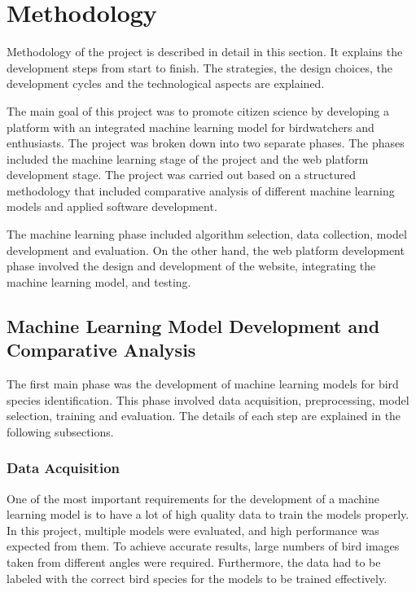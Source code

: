 \section{Methodology}

Methodology of the project is described in detail in this section. It explains the development steps from start to finish.
The strategies, the design choices, the development cycles and the technological aspects are explained.

The main goal of this project was to promote citizen science by developing a platform with an integrated machine learning model for birdwatchers and enthusiasts.
The project was broken down into two separate phases. The phases included the machine learning stage of the project and the web platform development stage. 
The project was carried out based on a structured methodology that included comparative analysis of different machine learning models and applied software development.

The machine learning phase included algorithm selection, data collection, model development and evaluation.
On the other hand, the web platform development phase involved the design and development of the website, integrating the machine learning model, and testing.

\subsection{Machine Learning Model Development and Comparative Analysis}

The first main phase was the development of machine learning models for bird species identification.
This phase involved data acquisition, preprocessing, model selection, training and evaluation.
The details of each step are explained in the following subsections.

\subsubsection{Data Acquisition}

One of the most important requirements for the development of a machine learning model is to have a lot of high quality data to train the models properly.
In this project, multiple models were evaluated, and high performance was expected from
them. To achieve accurate results, large numbers of bird images taken from different
angles were required. Furthermore, the data had to be labeled with the correct bird
species for the models to be trained effectively.


